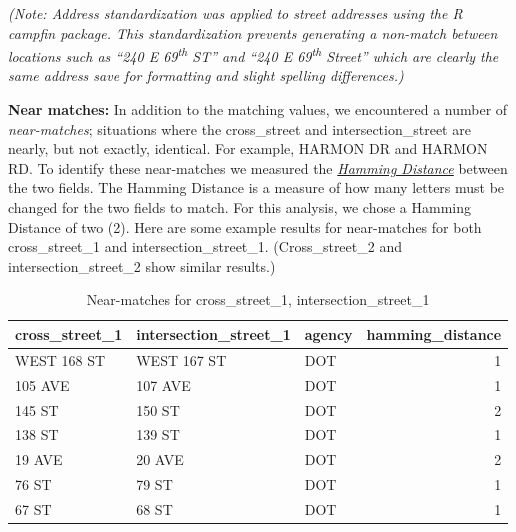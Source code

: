 \documentclass[linenumber]{jdsart}
\begin{document}
\textit{(Note: Address standardization was applied to  street 
addresses using the R \textit{campfin} package. This standardization 
prevents generating a non-match between locations such as 
``240 E 69\textsuperscript{th} ST'' and ``240 E 69\textsuperscript{th} Street'' 
which are clearly the same address save for formatting 
and slight spelling differences.)}


\textbf{Near matches:} In addition to the matching values, we 
encountered a number of \textit{near-matches}; situations where the 
cross\_street and intersection\_street are nearly, but not exactly, identical. 
For example, HARMON DR and HARMON RD. To identify these near-matches 
we measured the \href{https://en.wikipedia.org/wiki/Hamming_distance}
\textit{Hamming Distance} between the two fields. The Hamming Distance is a 
measure of how many letters must be changed for the two 
fields to match. For this analysis, we chose a Hamming Distance of two (2).
 Here are some example results for near-matches for both 
 cross\_street\_1 and intersection\_street\_1. 
 (Cross\_street\_2 and intersection\_street\_2 show similar results.)


\begin{table}[tbp]
    \centering
     \caption{Near-matches for cross\_street\_1, intersection\_street\_1}
     \label{tab:x1nearmatches}
		\begin{tabular}{l l l r}
	        \toprule
	        \textbf{cross\_street\_1} & \textbf{intersection\_street\_1} 
	        & \textbf{agency} & \textbf{hamming\_distance} \\
	        \midrule
	        WEST 168 ST    & WEST 167 ST           & DOT    & 1 \\
	        105 AVE        & 107 AVE               & DOT    & 1 \\
	        145 ST         & 150 ST                & DOT    & 2 \\
	        138 ST         & 139 ST                & DOT    & 1 \\
	        19 AVE         & 20 AVE                & DOT    & 2 \\
	        76 ST          & 79 ST                 & DOT    & 1 \\
	        67 ST          & 68 ST                 & DOT    & 1 \\
	        \bottomrule
	    \end{tabular}
\end{table}
\end{document}
